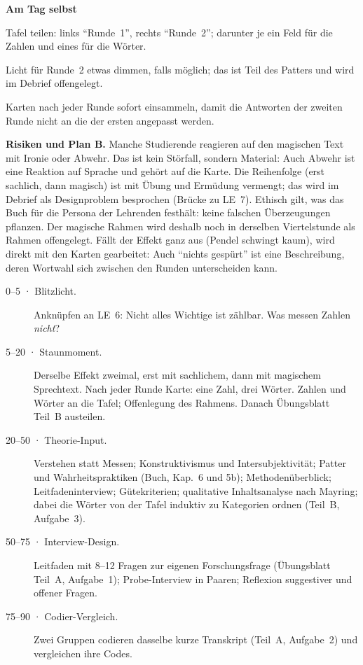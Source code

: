 \begin{vorbereitung}
\textbf{Am Tag selbst}
\begin{checkliste}
  \item Tafel teilen: links \enquote{Runde~1}, rechts \enquote{Runde~2};
    darunter je ein Feld für die Zahlen und eines für die Wörter.
  \item Licht für Runde~2 etwas dimmen, falls möglich; das ist Teil des
    Patters und wird im Debrief offengelegt.
  \item Karten nach jeder Runde sofort einsammeln, damit die Antworten
    der zweiten Runde nicht an die der ersten angepasst werden.
\end{checkliste}

\textbf{Risiken und Plan B.} Manche Studierende reagieren auf den
magischen Text mit Ironie oder Abwehr. Das ist kein Störfall, sondern
Material: Auch Abwehr ist eine Reaktion auf Sprache und gehört auf die
Karte. Die Reihenfolge (erst sachlich, dann magisch) ist mit Übung und
Ermüdung vermengt; das wird im Debrief als Designproblem besprochen
(Brücke zu LE~7). Ethisch gilt, was das Buch für die Persona der
Lehrenden festhält: keine falschen Überzeugungen pflanzen. Der magische
Rahmen wird deshalb noch in derselben Viertelstunde als Rahmen
offengelegt. Fällt der Effekt ganz aus (Pendel schwingt kaum), wird
direkt mit den Karten gearbeitet: Auch \enquote{nichts gespürt} ist eine
Beschreibung, deren Wortwahl sich zwischen den Runden unterscheiden kann.
\end{vorbereitung}

\begin{ablauf}
\begin{description}
\item[0--5 · Blitzlicht.] Anknüpfen an LE~6: Nicht alles Wichtige ist
  zählbar. Was messen Zahlen \emph{nicht}?
\item[5--20 · Staunmoment.] Derselbe Effekt zweimal, erst mit sachlichem,
  dann mit magischem Sprechtext. Nach jeder Runde Karte: eine Zahl,
  drei Wörter. Zahlen und Wörter an die Tafel; Offenlegung des Rahmens.
  Danach Übungsblatt Teil~B austeilen.
\item[20--50 · Theorie-Input.] Verstehen statt Messen; Konstruktivismus
  und Intersubjektivität; Patter und Wahrheitspraktiken (Buch, Kap.~6
  und 5b); Methodenüberblick; Leitfadeninterview; Gütekriterien;
  qualitative Inhaltsanalyse nach Mayring; dabei die Wörter von der Tafel
  induktiv zu Kategorien ordnen (Teil~B, Aufgabe~3).
\item[50--75 · Interview-Design.] Leitfaden mit 8--12 Fragen zur eigenen
  Forschungsfrage (Übungsblatt Teil~A, Aufgabe~1); Probe-Interview in
  Paaren; Reflexion suggestiver und offener Fragen.
\item[75--90 · Codier-Vergleich.] Zwei Gruppen codieren dasselbe kurze
  Transkript (Teil~A, Aufgabe~2) und vergleichen ihre Codes.
\end{description}
\end{ablauf}

